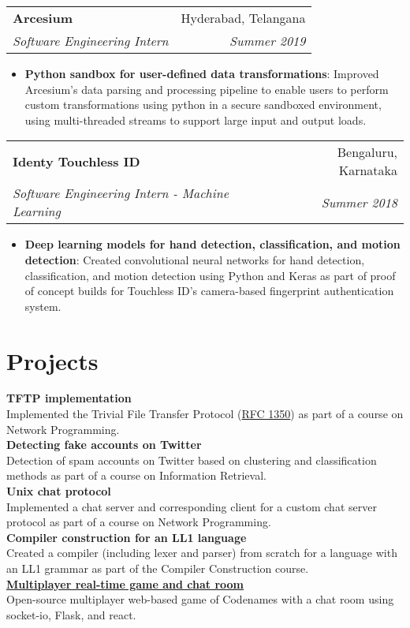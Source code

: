 \documentclass[letterpaper,11pt]{article}
\makeatletter
\newcommand{\resumeItem}[2]{
  \item\small{
    \textbf{#1}{: #2 \vspace{-1pt}}
  }
}
\newcommand{\resumeSubheading}[4]{
  \vspace{10pt}
    \begin{tabular*}{0.97\textwidth}{l@{\extracolsep{\fill}}r}
      \textbf{#1} & #2 \\
      \textit{\small#3} & \textit{\small #4} \\
    \end{tabular*}\vspace{-1pt}
}
\newcommand{\resumeItemListStart}{\begin{itemize}}
\newcommand{\resumeItemListEnd}{\end{itemize}\vspace{-2pt}}
\makeatother
\begin{document}
\resumeSubheading
{Arcesium}{Hyderabad, Telangana}
{Software Engineering Intern}{Summer 2019}
\resumeItemListStart
\resumeItem{Python sandbox for user-defined data transformations}
{Improved Arcesium's data parsing and processing pipeline to enable users to perform custom transformations using python in a secure sandboxed environment, using multi-threaded streams to support large input and output loads.}
\resumeItemListEnd

\resumeSubheading
{Identy Touchless ID}{Bengaluru, Karnataka}
{Software Engineering Intern - Machine Learning}{Summer 2018}
\resumeItemListStart
\resumeItem{Deep learning models for hand detection, classification, and motion detection}
{Created convolutional neural networks for hand detection, classification, and motion detection using Python and Keras as part of proof of concept builds for Touchless ID's camera-based fingerprint authentication system.}
\resumeItemListEnd


\section{Projects}
\textbf{TFTP implementation} \\
Implemented the Trivial File Transfer Protocol (\href{https://datatracker.ietf.org/doc/html/rfc1350}{RFC 1350}) as part of a course on Network Programming.
\vspace{3mm} \\
\textbf{Detecting fake accounts on Twitter} \\
Detection of spam accounts on Twitter based on clustering and classification methods as part of a course on Information Retrieval.
\vspace{3mm} \\
\textbf{Unix chat protocol} \\
Implemented a chat server and corresponding client for a custom chat server protocol as part of a course on Network Programming.
\vspace{3mm} \\
\textbf{Compiler construction for an LL1 language} \\
Created a compiler (including lexer and parser) from scratch for a language with an LL1 grammar as part of the Compiler Construction course.
\vspace{3mm} \\
\textbf{\href{https://github.com/naveen-u/lets-play}{Multiplayer real-time game and chat room}} \\
Open-source multiplayer web-based game of Codenames with a chat room using socket-io, Flask, and react.
\end{document}
